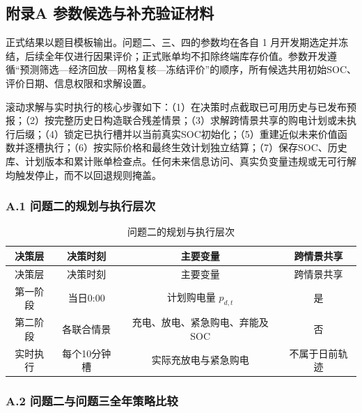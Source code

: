 \documentclass[zihao=-4,a4paper,UTF8,fontset=none]{ctexart}
\begin{document}
\subsection*{附录A 参数候选与补充验证材料}

正式结果以题目模板输出。问题二、三、四的参数均在各自 1 月开发期选定并冻结，后续全年仅进行因果评价；正式账单均不扣除终端库存价值。参数开发遵循``预测筛选---经济回放---网格复核---冻结评价''的顺序，所有候选共用初始SOC、评价日期、信息权限和求解设置。

滚动求解与实时执行的核心步骤如下：（1）在决策时点截取已可用历史与已发布预报；（2）按完整历史日构造联合残差情景；（3）求解跨情景共享的购电计划或未执行后缀；（4）锁定已执行槽并以当前真实SOC初始化；（5）重建近似未来价值函数并逐槽执行；（6）按实际价格和最终生效计划独立结算；（7）保存SOC、历史库、计划版本和累计账单检查点。任何未来信息访问、真实负变量违规或无可行解均触发停止，而不以回退规则掩盖。

\par\pagebreak[2]\subsubsection*{A.1 问题二的规划与执行层次}

\begingroup\renewcommand{\tablename}{附表}\renewcommand{\thetable}{A-1}

\begin{longtable}[]{@{}cccc@{}}
\caption{问题二的规划与执行层次}\label{tab:appendix-A-1}\tabularnewline
\toprule\noalign{}
决策层 & 决策时刻 & 主要变量 & 跨情景共享 \\
\midrule\noalign{}
\endfirsthead
\toprule\noalign{}
决策层 & 决策时刻 & 主要变量 & 跨情景共享 \\
\midrule\noalign{}
\endhead
\bottomrule\noalign{}
\endlastfoot
第一阶段 & 当日0:00 & 计划购电量 \(p_{d,t}\) & 是 \\
第二阶段 & 各联合情景 & 充电、放电、紧急购电、弃能及SOC & 否 \\
实时执行 & 每个10分钟槽 & 实际充放电与紧急购电 & 不属于日前轨迹 \\
\end{longtable}

\endgroup

\par\pagebreak[2]\subsubsection*{A.2 问题二与问题三全年策略比较}

\begingroup\renewcommand{\tablename}{附表}\renewcommand{\thetable}{A-2}
\end{document}
